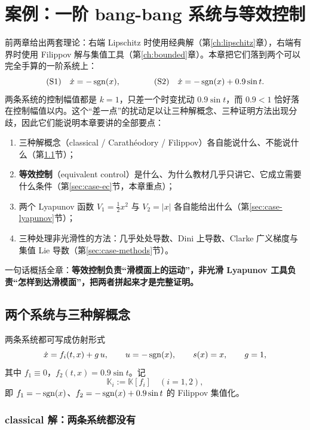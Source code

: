 \chapter{案例：一阶 bang-bang 系统与等效控制}\label{ch:case}

前两章给出两套理论：右端 Lipschitz 时使用经典解（第\ref{ch:lipschitz}章），右端有界时使用 Filippov 解与集值工具（第\ref{ch:bounded}章）。本章把它们落到两个可以完全手算的一阶系统上：
\begin{equation}\label{eq:case-system}
  \text{(S1)}\quad \dot x=-\operatorname{sgn}(x),
  \qquad\qquad
  \text{(S2)}\quad \dot x=-\operatorname{sgn}(x)+0.9\sin t .
\end{equation}
两条系统的控制幅值都是 $k=1$，只差一个时变扰动 $0.9\sin t$，而 $0.9<1$ 恰好落在控制幅值以内。这个“差一点”的扰动足以让三种解概念、三种证明方法出现分歧，因此它们能说明本章要讲的全部要点：
\begin{enumerate}
  \item 三种解概念（classical / Carathéodory / Filippov）各自能说什么、不能说什么（第\ref{sec:case-solutions}节）；
  \item \textbf{等效控制}（equivalent control）是什么、为什么教材几乎只讲它、它成立需要什么条件（第\ref{sec:case-ec}节，本章重点）；
  \item 两个 Lyapunov 函数 $V_1=\tfrac12x^2$ 与 $V_2=|x|$ 各自能给出什么（第\ref{sec:case-lyapunov}节）；
  \item 三种处理非光滑性的方法：几乎处处导数、Dini 上导数、Clarke 广义梯度与集值 Lie 导数（第\ref{sec:case-methods}节）。
\end{enumerate}

一句话概括全章：\textbf{等效控制负责“滑模面上的运动”，非光滑 Lyapunov 工具负责“怎样到达滑模面”，把两者拼起来才是完整证明。}

\section{两个系统与三种解概念}\label{sec:case-solutions}

两条系统都可写成仿射形式
\[
\dot x=f_i(t,x)+g\,u,\qquad u=-\operatorname{sgn}(x),\qquad s(x)=x,\qquad g=1,
\]
其中 $f_1\equiv0$，$f_2(t,x)=0.9\sin t$。记
\begin{equation}\label{eq:case-fields}
  \mathbb{K}_i:=\mathbb{K}[f_i]\quad(i=1,2),
\end{equation}
即 $f_1=-\operatorname{sgn}(x)$、$f_2=-\operatorname{sgn}(x)+0.9\sin t$ 的 Filippov 集值化。

\subsection{classical 解：两条系统都没有}

